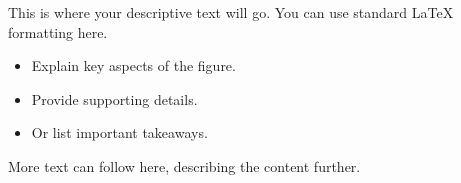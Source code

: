 \documentclass[12pt]{beamer} %
\begin{document}
\begin{frame}
\begin{columns}[T]
\begin{column}{0.48\textwidth}
			\end{column}
			
			\begin{column}{0.48\textwidth} %
				This is where your descriptive text will go.
				You can use standard LaTeX formatting here.
				\begin{itemize}
					\item Explain key aspects of the figure.
					\item Provide supporting details.
					\item Or list important takeaways.
				\end{itemize}
				More text can follow here, describing the content further.
			\end{column}
			
		\end{columns}
	\end{frame}
	
\end{document}
